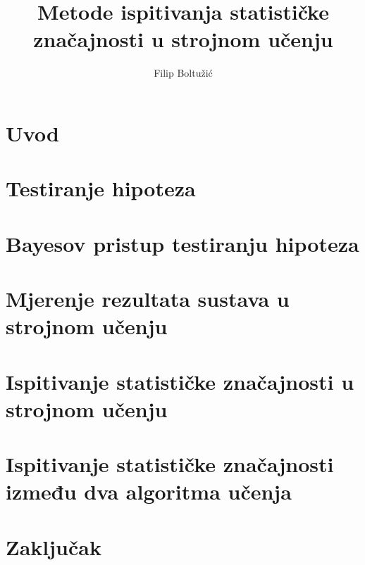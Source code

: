 \documentclass[times, utf8, seminar]{fer}
\begin{document}

\title{Metode ispitivanja statističke značajnosti u strojnom učenju}

\author{Filip Boltužić}
\maketitle

\tableofcontents

\chapter{Uvod}


\chapter{Testiranje hipoteza}
\label{chap:test_hipoteza}


\chapter{Bayesov pristup testiranju hipoteza}


\chapter{Mjerenje rezultata sustava u strojnom učenju}


\chapter{Ispitivanje statističke značajnosti u strojnom učenju}


\chapter{Ispitivanje statističke značajnosti između dva algoritma učenja}


\chapter{Zaključak}




\end{document}
